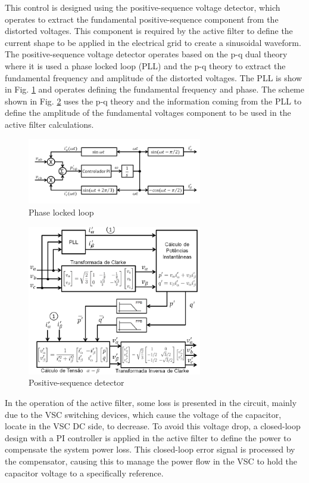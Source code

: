 This control is designed using the positive-sequence voltage detector, which operates to extract the fundamental positive-sequence component from the distorted voltages. This component is required by the active filter to define the current shape to be applied in the electrical grid to create a sinusoidal waveform. 
The positive-sequence voltage detector operates based on the p-q dual theory where it is used a phase locked loop (PLL) and the p-q theory to extract the fundamental frequency and amplitude of the distorted voltages. The PLL is show in Fig. \ref{fig:PLL.png} and operates defining the fundamental frequency and phase. The scheme shown in Fig. \ref{fig:detector_seq_positiva.png} uses the p-q theory and the information coming from the PLL to define the amplitude of the fundamental voltages component to be used in the active filter calculations.


\begin{figure}[!th]
	\centering
	\includegraphics[width=3in]{Figures/PLL.png}
	\caption{Phase locked loop}
	\label{fig:PLL.png}
\end{figure}

\begin{figure}[!th]
	\centering
	\includegraphics[width=3in]{Figures/detector_seq_positiva.png}
	\caption{Positive-sequence detector}
	\label{fig:detector_seq_positiva.png}
\end{figure}

In the operation of the active filter, some loss is presented in the circuit, mainly due to the VSC switching devices, which cause the voltage of the capacitor, locate in the VSC DC side, to decrease. To avoid this voltage drop, a closed-loop design with a PI controller is applied in the active filter to define the power to compensate the system power loss. This closed-loop error signal is processed by the compensator, causing this to manage the power flow in the VSC to hold the capacitor voltage to a specifically reference.